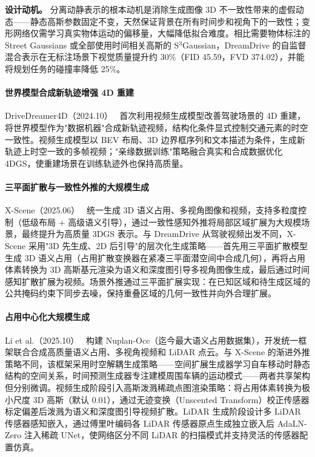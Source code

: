 \textbf{设计动机。} 分离动静表示的根本动机是消除生成图像 3D 不一致性带来的虚假动态——静态高斯参数固定不变，天然保证背景在所有时间步和视角下的一致性；变形网络仅需学习真实物体运动的偏移量，大幅降低拟合难度。相比需要物体标注的 Street Gaussians 或全部使用时间相关高斯的 S$^3$Gaussian，DreamDrive 的自监督混合表示在无标注场景下视觉质量提升约 30\%（FID 45.59，FVD 374.02），并能将规划任务的碰撞率降低 25\%。

\paragraph{世界模型合成新轨迹增强 4D 重建}

DriveDreamer4D（2024.10）~\cite{2410_13571} 首次利用视频生成模型改善驾驶场景的 4D 重建，将世界模型作为"数据机器"合成新轨迹视频，结构化条件显式控制交通元素的时空一致性。视频生成模型以 BEV 布局、3D 边界框序列和文本描述为条件，生成新轨迹上时空一致的多帧视频；"亲缘数据训练"策略融合真实和合成数据优化 4DGS，使重建场景在训练轨迹外也保持高质量。

\paragraph{三平面扩散与一致性外推的大规模生成}

X-Scene（2025.06）~\cite{2506_13558} 统一生成 3D 语义占用、多视角图像和视频，支持多粒度控制（低级布局 + 高级语义引导），通过一致性感知外推将局部区域扩展为大规模场景，最终提升为高质量 3DGS 表示。与 DreamDrive 从驾驶视频出发不同，X-Scene 采用"3D 先生成、2D 后引导"的层次化生成策略——首先用三平面扩散模型生成 3D 语义占用（占用扩散变换器在紧凑三平面潜空间中合成几何），再将占用体素转换为 3D 高斯基元渲染为语义和深度图引导多视角图像生成，最后通过时间感知扩散扩展为视频。场景外推通过三平面扩展实现：在已知区域和待生成区域的公共掩码约束下同步去噪，保持重叠区域的几何一致性并向外合理扩展。

\paragraph{占用中心化大规模生成}

Li et al.（2025.10）~\cite{2510_22973} 构建 Nuplan-Occ（迄今最大语义占用数据集），开发统一框架联合合成高质量语义占用、多视角视频和 LiDAR 点云。与 X-Scene 的渐进外推策略不同，该框架采用时空解耦生成策略——空间扩展生成器学习自车移动时静态结构的空间关系，时间预测生成器专注建模周围车辆的运动模式——两者共享架构但分别微调。视频生成阶段引入高斯泼溅稀疏点图渲染策略：将占用体素转换为极小尺度 3D 高斯（默认 0.01），通过无迹变换（Unscented Transform）校正传感器标定偏差后泼溅为语义和深度图引导视频扩散。LiDAR 生成阶段设计多 LiDAR 传感器感知嵌入，通过傅里叶编码各 LiDAR 传感器原点生成独立嵌入后 AdaLN-Zero 注入稀疏 UNet，使网络区分不同 LiDAR 的扫描模式并支持灵活的传感器配置仿真。

